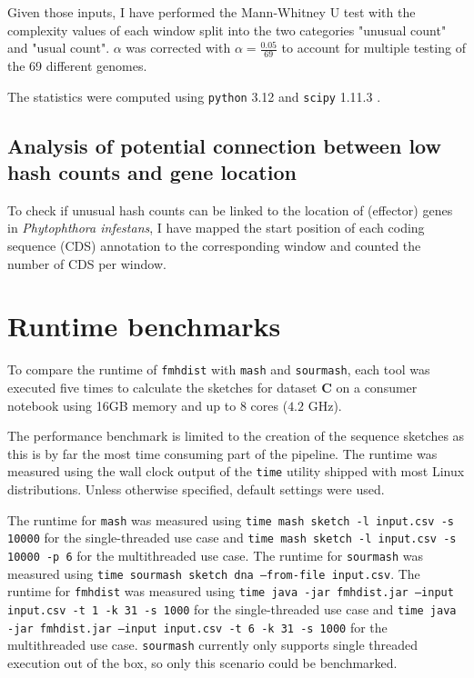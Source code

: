 Given those inputs, I have performed the Mann-Whitney U test
\cite{mannTestWhetherOne1947,wilcoxonIndividualComparisonsRanking1945} with the
complexity values of each window split into the two categories "unusual count"
and "usual count". $\alpha$ was corrected with $\alpha = \frac{0.05}{69}$ to
account for multiple testing of the 69 different genomes.

The statistics were computed using \texttt{python} 3.12
\cite{vanrossumPythonReferenceManual2009} and \texttt{scipy} 1.11.3
\cite{virtanenSciPyFundamentalAlgorithms2020}.

\subsection*{Analysis of potential connection between low hash counts and gene location}
To check if unusual hash counts can be linked to the location of (effector)
genes in \textit{Phytophthora infestans}, I have mapped the start position of
each coding sequence (CDS) annotation to the corresponding window and counted
the number of CDS per window.

\section{Runtime benchmarks}
To compare the runtime of \texttt{fmhdist} with \texttt{mash} and
\texttt{sourmash}, each tool was executed five times to calculate the sketches
for dataset \textbf{C} on a consumer notebook using 16GB memory and up to 8
cores ($4.2$ GHz).

The performance benchmark is limited to the creation of the sequence sketches
as this is by far the most time consuming part of the pipeline. The runtime was
measured using the wall clock output of the \texttt{time} utility shipped with
most Linux distributions. Unless otherwise specified, default settings were
used. 

The runtime for \texttt{mash} was measured using \texttt{time mash sketch -l
input.csv -s 10000} for the single-threaded use case and \texttt{time mash
sketch -l input.csv -s 10000 -p 6} for the multithreaded use case. The runtime
for \texttt{sourmash} was measured using \texttt{time sourmash sketch dna
--from-file input.csv}. The runtime for \texttt{fmhdist} was measured using
\texttt{time java -jar fmhdist.jar --input input.csv -t 1 -k 31 -s 1000} for the
single-threaded use case and \texttt{time java -jar fmhdist.jar --input
input.csv -t 6 -k 31 -s 1000} for the multithreaded use case. \texttt{sourmash}
currently only supports single threaded execution out of the box, so only this
scenario could be benchmarked.
